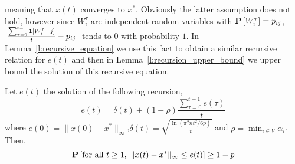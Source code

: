 meaning that $x(t)$ converges to $x^*$.
Obviously the latter assumption does not hold,
however since $W_i^{\tau}$ are independent random variables
with $\bm{\mathrm{P}}\left[W_i^\tau\right]=p_{ij}$,
$|\frac{\sum_{\tau=0}^{t-1} \bm{1}{\left[W_i^{\tau}=j\right]}}{t} - p_{ij}|$
tends to $0$ with probability $1$.
In Lemma~\ref{l:recursive_equation} we use this fact
to obtain a similar recursive relation for $e(t)$
and then in Lemma~\ref{l:recursion_upper_bound}
we upper bound the solution of this recursive equation.
\begin{lemma}\label{l:recursive_equation}
Let $e(t)$ the solution of the following recursion,
\[e(t) =\delta(t) + (1-\rho)\frac{\sum_{\tau=0}^{t-1}e(\tau)}{t}\]
where $e(0)=\|x(0) - x^*\|_{\infty}$,\(\delta(t) = \sqrt{\frac{\ln(\pi^2n t^2/6p)}{t}}\)
and $\rho = \min_{i \in V}\alpha_i$. Then,
\[\bm{\mathrm{P}}\left[\text{for all }t \geq 1, ~\| x(t)-x^* \|_{\infty}\leq e(t)\right] \geq 1-p\]
\end{lemma}
